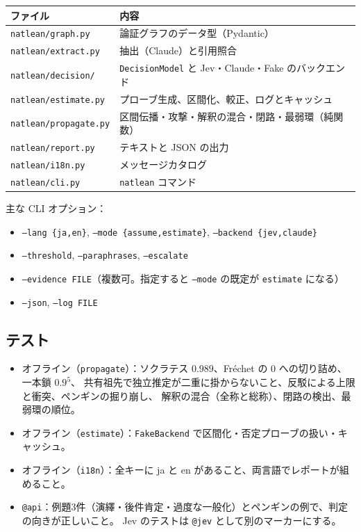 \documentclass[a4paper,11pt]{ltjsarticle}
\begin{document}
\begin{center}\small
\begin{tabular}{ll}
\toprule
ファイル & 内容 \\
\midrule
\texttt{natlean/graph.py} & 論証グラフのデータ型（Pydantic） \\
\texttt{natlean/extract.py} & 抽出（Claude）と引用照合 \\
\texttt{natlean/decision/} & \texttt{DecisionModel} と Jev・Claude・Fake のバックエンド \\
\texttt{natlean/estimate.py} & プローブ生成、区間化、較正、ログとキャッシュ \\
\texttt{natlean/propagate.py} & 区間伝播・攻撃・解釈の混合・閉路・最弱環（純関数） \\
\texttt{natlean/report.py} & テキストと JSON の出力 \\
\texttt{natlean/i18n.py} & メッセージカタログ \\
\texttt{natlean/cli.py} & \texttt{natlean} コマンド \\
\bottomrule
\end{tabular}
\end{center}

主な CLI オプション：
\begin{itemize}\small
  \item \texttt{--lang \{ja,en\}}, \texttt{--mode \{assume,estimate\}}, \texttt{--backend \{jev,claude\}}
  \item \texttt{--threshold}, \texttt{--paraphrases}, \texttt{--escalate}
  \item \texttt{--evidence FILE}（複数可。指定すると \texttt{--mode} の既定が \texttt{estimate} になる）
  \item \texttt{--json}, \texttt{--log FILE}
\end{itemize}

\subsection{テスト}

\begin{itemize}
  \item オフライン（\texttt{propagate}）：ソクラテス $0.989$、Fréchet の 0 への切り詰め、一本鎖 $0.9^5$、
        共有祖先で独立推定が二重に掛からないこと、反駁による上限と衝突、ペンギンの掘り崩し、
        解釈の混合（全称と総称）、閉路の検出、最弱環の順位。
  \item オフライン（\texttt{estimate}）：\texttt{FakeBackend} で区間化・否定プローブの扱い・キャッシュ。
  \item オフライン（\texttt{i18n}）：全キーに ja と en があること、両言語でレポートが組めること。
  \item \texttt{@api}：例題3件（演繹・後件肯定・過度な一般化）とペンギンの例で、判定の向きが正しいこと。
        Jev のテストは \texttt{@jev} として別のマーカーにする。
\end{itemize}
\end{document}
